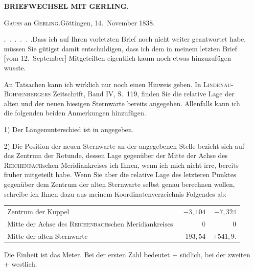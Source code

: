\par\clearpage
\noindent{}\hfill{\small\textbf{BRIEFWECHSEL MIT GERLING.}}\hfill\null\par\medskip
\begin{center}
\textsc{Gauss} an \textsc{Gerling}.\quad Göttingen, 14.~November 1838.
\end{center}
\par\noindent\hspace*{\parindent}\mbox{.\ .\ .\ .\ .\ .}\quad Dass ich auf Ihren vorletzten Brief noch nicht weiter geantwortet habe, müssen Sie gütigst damit entschuldigen, dass ich dem in meinem letzten Brief [vom 12.~September] Mitgeteilten eigentlich kaum noch etwas hinzuzufügen wusste.
\par\noindent\hspace*{\parindent}An Tatsachen kann ich wirklich nur noch einen Hinweis geben. In \textsc{Lindenau-Bohnenbergers} Zeitschrift, Band IV, S.~119, finden Sie die relative Lage der alten und der neuen hiesigen Sternwarte bereits angegeben. Allenfalls kann ich die folgenden beiden Anmerkungen hinzufügen.
\par\noindent\hspace*{\parindent}1) Der Längenunterschied ist in  angegeben.
\par\noindent\hspace*{\parindent}2) Die Position der neuen Sternwarte an der angegebenen Stelle bezieht sich auf das Zentrum der Rotunde, dessen Lage gegenüber der Mitte der Achse des \textsc{Reichenbach}schen Meridiankreises ich Ihnen, wenn ich mich nicht irre, bereits früher mitgeteilt habe. Wenn Sie aber die relative Lage des letzteren Punktes gegenüber dem Zentrum der alten Sternwarte selbst genau berechnen wollen, schreibe ich Ihnen dazu aus meinem Koordinatenverzeichnis Folgendes ab:
\begin{center}
\setlength{\tabcolsep}{4pt}
\begin{tabular}{@{}lrr@{}}
Zentrum der Kuppel & \(-3{,}104\) & \(-7{,}324\)\\
Mitte der Achse des \textsc{Reichenbach}schen Meridiankreises & \(0\) & \(0\)\\
Mitte der alten Sternwarte & \(-193{,}54\) & \(+541{,}9\).
\end{tabular}
\end{center}
\par\noindent\hspace*{\parindent}Die Einheit ist das Meter. Bei der ersten Zahl bedeutet \(+\) südlich, bei der zweiten \(+\) westlich.
